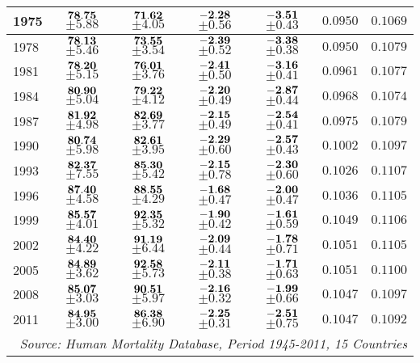 \documentclass[10pt, titlepage]{article}%
\begin{document}
\begin{table}
\begin{tabular}{||l|c|c|c|c|c|c||}
  1975 &  $\bf 78.75$ $\pm 5.88$& $\bf 71.62$ $\pm 4.05$& $\bf -2.28$ $\pm 0.56$& $\bf -3.51$ $\pm 0.43$&  $0.0950$&  $0.1069$ \\ \hline\hline
  1978 &  $\bf 78.13$ $\pm 5.46$& $\bf 73.55$ $\pm 3.54$& $\bf -2.39$ $\pm 0.52$& $\bf -3.38$ $\pm 0.38$&  $0.0950$&  $0.1079$ \\ \hline\hline
  1981 &  $\bf 78.20$ $\pm 5.15$& $\bf 76.01$ $\pm 3.76$& $\bf -2.41$ $\pm 0.50$& $\bf -3.16$ $\pm 0.41$&  $0.0961$&  $0.1077$ \\ \hline\hline
  1984 &  $\bf 80.90$ $\pm 5.04$& $\bf 79.22$ $\pm 4.12$& $\bf -2.20$ $\pm 0.49$& $\bf -2.87$ $\pm 0.44$&  $0.0968$&  $0.1074$ \\ \hline\hline
  1987 &  $\bf 81.92$ $\pm 4.98$& $\bf 82.69$ $\pm 3.77$& $\bf -2.15$ $\pm 0.49$& $\bf -2.54$ $\pm 0.41$&  $0.0975$&  $0.1079$ \\ \hline\hline
  1990 &  $\bf 80.74$ $\pm 5.98$& $\bf 82.61$ $\pm 3.95$& $\bf -2.29$ $\pm 0.60$& $\bf -2.57$ $\pm 0.43$&  $0.1002$&  $0.1097$ \\ \hline\hline
  1993 &  $\bf 82.37$ $\pm 7.55$& $\bf 85.30$ $\pm 5.42$& $\bf -2.15$ $\pm 0.78$& $\bf -2.30$ $\pm 0.60$&  $0.1026$&  $0.1107$ \\ \hline\hline
  1996 &  $\bf 87.40$ $\pm 4.58$& $\bf 88.55$ $\pm 4.29$& $\bf -1.68$ $\pm 0.47$& $\bf -2.00$ $\pm 0.47$&  $0.1036$&  $0.1105$ \\ \hline\hline
  1999 &  $\bf 85.57$ $\pm 4.01$& $\bf 92.35$ $\pm 5.32$& $\bf -1.90$ $\pm 0.42$& $\bf -1.61$ $\pm 0.59$&  $0.1049$&  $0.1106$ \\ \hline\hline
  2002 &  $\bf 84.40$ $\pm 4.22$& $\bf 91.19$ $\pm 6.44$& $\bf -2.09$ $\pm 0.44$& $\bf -1.78$ $\pm 0.71$&  $0.1051$&  $0.1105$ \\ \hline\hline
  2005 &  $\bf 84.89$ $\pm 3.62$& $\bf 92.58$ $\pm 5.73$& $\bf -2.11$ $\pm 0.38$& $\bf -1.71$ $\pm 0.63$&  $0.1051$&  $0.1100$ \\ \hline\hline
  2008 &  $\bf 85.07$ $\pm 3.03$& $\bf 90.51$ $\pm 5.97$& $\bf -2.16$ $\pm 0.32$& $\bf -1.99$ $\pm 0.66$&  $0.1047$&  $0.1097$ \\ \hline\hline
  2011 &  $\bf 84.95$ $\pm 3.00$& $\bf 86.38$ $\pm 6.90$& $\bf -2.25$ $\pm 0.31$& $\bf -2.51$ $\pm 0.75$&  $0.1047$&  $0.1092$ \\ \hline\hline
        
\multicolumn{7}{||r||}{{\em Source: Human Mortality Database, Period 1945-2011, 15 Countries}} \\ \hline\hline
\end{tabular}
\label{table5a}
\end{table}
\end{document}
